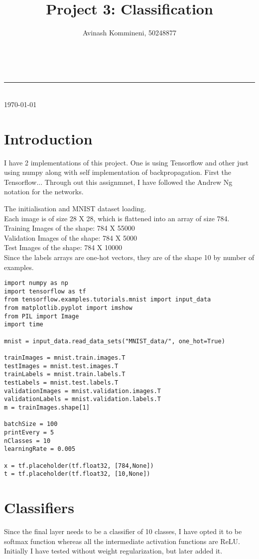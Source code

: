\documentclass[a4paper,11pt]{article}
\makeatletter
\newcommand{\linia}{\rule{\linewidth}{0.5pt}}
\renewcommand{\maketitle}{
\begin{center}
\vspace{2ex}
{\LARGE \textsc{\@title}}
\vspace{1ex}
\\
\linia\\
\@author \hfill \today
\vspace{4ex}
\end{center}
}
\makeatother
\begin{document}
\title{Project 3: Classification}

\author{Avinash Kommineni, 50248877} 


\maketitle

\section{Introduction}

I have 2 implementations of this project. One is using Tensorflow and other just using numpy along with self implementation of backpropagation. First the Tensorflow... Through out this assignmnet, I have followed the Andrew Ng notation for the networks.

The initialisation and MNIST dataset loading.\\
Each image is of size 28 X 28, which is flattened into an array of size 784.\\
Training Images of the shape: 784 X 55000\\
Validation Images of the shape: 784 X 5000\\
Test Images of the shape: 784 X 10000\\
Since the labels arrays are one-hot vectors, they are of the shape 10 by number of examples.\\ 

\begin{lstlisting}[label={list:first}]
import numpy as np
import tensorflow as tf
from tensorflow.examples.tutorials.mnist import input_data
from matplotlib.pyplot import imshow
from PIL import Image
import time

mnist = input_data.read_data_sets("MNIST_data/", one_hot=True)

trainImages = mnist.train.images.T
testImages = mnist.test.images.T
trainLabels = mnist.train.labels.T
testLabels = mnist.test.labels.T
validationImages = mnist.validation.images.T
validationLabels = mnist.validation.labels.T
m = trainImages.shape[1]

batchSize = 100
printEvery = 5
nClasses = 10
learningRate = 0.005

x = tf.placeholder(tf.float32, [784,None])
t = tf.placeholder(tf.float32, [10,None])
\end{lstlisting}

\section{Classifiers}
Since the final layer needs to be a classifier of 10 classes, I have opted it to be softmax function whereas all the intermediate activation functions are ReLU. Initially I have tested without weight regularization, but later added it.
\end{document}
